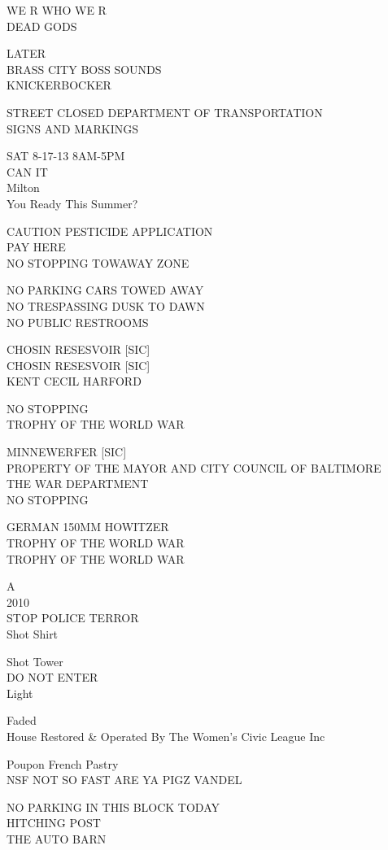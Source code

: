 \documentclass[10pt,letterpaper]{article}
\begin{document}
WE R WHO WE R\\
DEAD GODS

LATER\\
BRASS CITY BOSS SOUNDS\\
KNICKERBOCKER

STREET CLOSED DEPARTMENT OF TRANSPORTATION\\
SIGNS AND MARKINGS

SAT 8{-}17{-}13 8AM{-}5PM\\
CAN IT\\
Milton\\
You Ready This Summer?

CAUTION PESTICIDE APPLICATION\\
PAY HERE\\
NO STOPPING TOWAWAY ZONE

NO PARKING CARS TOWED AWAY\\
NO TRESPASSING DUSK TO DAWN\\
NO PUBLIC RESTROOMS

CHOSIN RESESVOIR {[}SIC{]}\\
CHOSIN RESESVOIR {[}SIC{]}\\
KENT CECIL HARFORD

NO STOPPING\\
TROPHY OF THE WORLD WAR

MINNEWERFER {[}SIC{]}\\
PROPERTY OF THE MAYOR AND CITY COUNCIL OF BALTIMORE\\
THE WAR DEPARTMENT\\
NO STOPPING

GERMAN 150MM HOWITZER\\
TROPHY OF THE WORLD WAR\\
TROPHY OF THE WORLD WAR

A\\
2010\\
STOP POLICE TERROR\\
Shot Shirt

Shot Tower\\
DO NOT ENTER\\
Light

Faded\\
House Restored \& Operated By The Women's Civic League Inc

Poupon French Pastry\\
NSF NOT SO FAST ARE YA PIGZ VANDEL

NO PARKING IN THIS BLOCK TODAY\\
HITCHING POST\\
THE AUTO BARN
\end{document}
